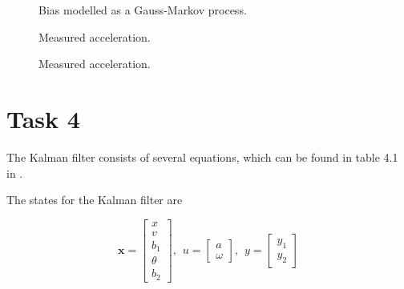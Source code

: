 \documentclass{article}
\begin{document}
\begin{figure}[!ht]
    \centering
    \caption{Bias modelled as a Gauss-Markov process.}
    \label{fig:disc_bias}
\end{figure}

\begin{figure}[!ht]
    \centering
    \caption{Measured acceleration.}
    \label{fig:accel_task3}
\end{figure}

\begin{figure}[!ht]
    \centering
    \caption{Measured acceleration.}
    \label{fig:accel_task3}
\end{figure}

\section*{Task 4}
The Kalman filter consists of several equations, which can be found in table 4.1 in \cite{heftet}.

The states for the Kalman filter are

\begin{equation}
	\bm{x} =
	\begin{bmatrix}
		x \\ v \\ b_1 \\ \theta \\ b_2
	\end{bmatrix}
	, \hspace{5pt} u = 
	\begin{bmatrix}
		a \\ \omega
	\end{bmatrix}
	, \hspace{5pt} y = 
	\begin{bmatrix}
		y_1 \\ y_2
	\end{bmatrix}
\end{equation}
\end{document}
